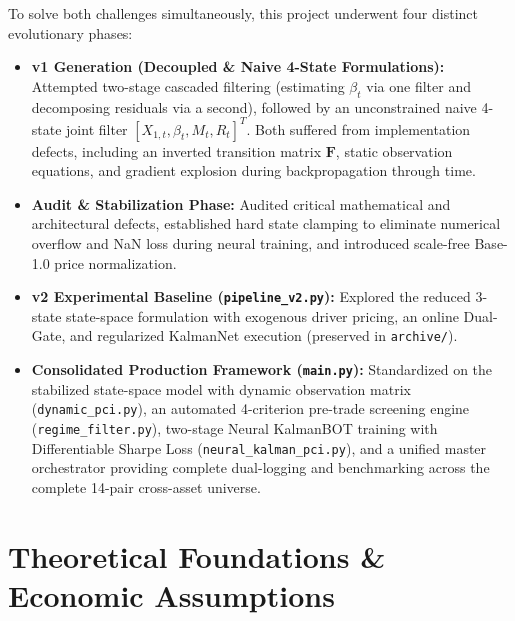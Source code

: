 \documentclass[11pt, a4paper]{article}
\begin{document}
To solve both challenges simultaneously, this project underwent four distinct evolutionary phases:
\begin{itemize}
    \item \textbf{v1 Generation (Decoupled \& Naive 4-State Formulations):} Attempted two-stage cascaded filtering (estimating $\beta_t$ via one filter and decomposing residuals via a second), followed by an unconstrained naive 4-state joint filter $[X_{1,t}, \beta_t, M_t, R_t]^T$. Both suffered from implementation defects, including an inverted transition matrix $\mathbf{F}$, static observation equations, and gradient explosion during backpropagation through time.
    \item \textbf{Audit \& Stabilization Phase:} Audited critical mathematical and architectural defects, established hard state clamping to eliminate numerical overflow and NaN loss during neural training, and introduced scale-free Base-1.0 price normalization.
    \item \textbf{v2 Experimental Baseline (\texttt{pipeline\_v2.py}):} Explored the reduced 3-state state-space formulation with exogenous driver pricing, an online Dual-Gate, and regularized KalmanNet execution (preserved in \texttt{archive/}).
    \item \textbf{Consolidated Production Framework (\texttt{main.py}):} Standardized on the stabilized state-space model with dynamic observation matrix (\texttt{dynamic\_pci.py}), an automated 4-criterion pre-trade screening engine (\texttt{regime\_filter.py}), two-stage Neural KalmanBOT training with Differentiable Sharpe Loss (\texttt{neural\_kalman\_pci.py}), and a unified master orchestrator providing complete dual-logging and benchmarking across the complete 14-pair cross-asset universe.
\end{itemize}

\section{Theoretical Foundations \& Economic Assumptions}
\end{document}
